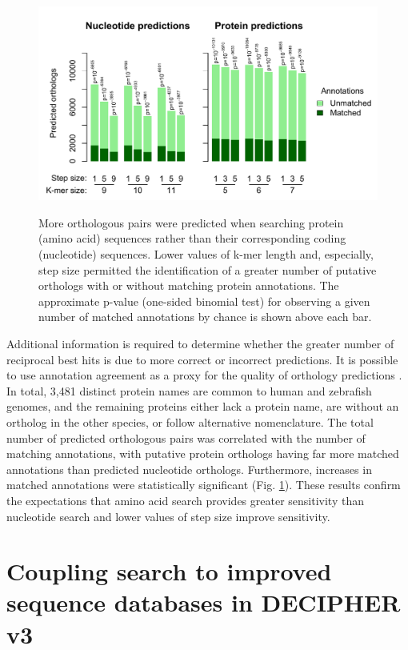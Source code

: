\begin{figure}
\includegraphics[width=1\linewidth,alt={}]{figures/Fig5} \caption{More orthologous pairs were predicted when searching protein (amino acid) sequences rather than their corresponding coding (nucleotide) sequences. Lower values of k-mer length and, especially, step size permitted the identification of a greater number of putative orthologs with or without matching protein annotations. The approximate p-value (one-sided binomial test) for observing a given number of matched annotations by chance is shown above each bar.}\label{fig:fig5}
\end{figure}

Additional information is required to determine whether the greater number of reciprocal best hits is due to more correct or incorrect predictions. It is possible to use annotation agreement as a proxy for the quality of orthology predictions \citep{RN257}. In total, 3,481 distinct protein names are common to human and zebrafish genomes, and the remaining proteins either lack a protein name, are without an ortholog in the other species, or follow alternative nomenclature. The total number of predicted orthologous pairs was correlated with the number of matching annotations, with putative protein orthologs having far more matched annotations than predicted nucleotide orthologs. Furthermore, increases in matched annotations were statistically significant (Fig. \ref{fig:fig5}). These results confirm the expectations that amino acid search provides greater sensitivity than nucleotide search and lower values of step size improve sensitivity.

\section{Coupling search to improved sequence databases in DECIPHER v3}\label{coupling-search-to-improved-sequence-databases-in-decipher-v3}

